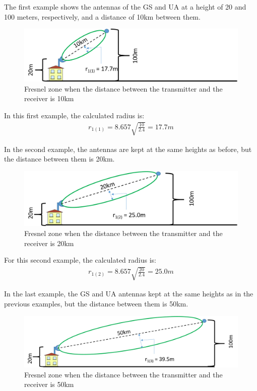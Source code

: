 The first example shows the antennas of the GS and UA at a height of 20 and 100 meters, respectively, and a distance of 10km between them.

\begin{figure}[H]
	\centering
	\includegraphics[scale=0.50]{figures/fresnel_10km.png}
	\caption{Fresnel zone when the distance between the transmitter and the receiver is 10km}
	\label{fig:fresnel_zones_10km}
\end{figure}  

In this first example, the calculated radius is:
\begin{align*}
r_{1(1)} = 8.657 \sqrt{\frac{10}{2.4}} = 17.7m
\end{align*}

In the second example, the antennas are kept at the same heights as before, but the distance between them is 20km.

\begin{figure}[H]
	\centering
	\includegraphics[scale=0.50]{figures/fresnel_20km.png}
	\caption{Fresnel zone when the distance between the transmitter and the receiver is 20km}
	\label{fig:fresnel_zones_20km}
\end{figure}  

For this second example, the calculated radius is:
\begin{align*}
r_{1(2)} = 8.657 \sqrt{\frac{20}{2.4}} = 25.0m
\end{align*}

In the last example, the GS and UA antennas kept at the same heights as in the previous examples, but the distance between them is 50km.

\begin{figure}[H]
	\centering
	\includegraphics[scale=0.50]{figures/fresnel_50km.png}
	\caption{Fresnel zone when the distance between the transmitter and the receiver is 50km}
	\label{fig:fresnel_zones_50km}
\end{figure}  

